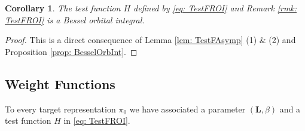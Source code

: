\documentclass[A4]{amsart}
\newtheorem{corollary}  [theorem]{Corollary}
\numberwithin{equation}{section} \everymath{\displaystyle}
\newcommand{\bL}{\mathbf{L}}
\begin{document}
\begin{corollary} \label{cor: TestFROI}
	The test function $H$ defined by \eqref{eq: TestFROI} and Remark \ref{rmk: TestFROI} is a Bessel orbital integral.
\end{corollary}
\begin{proof}
	This is a direct consequence of Lemma \ref{lem: TestFAsymp} (1) \& (2) and Proposition \ref{prop: BesselOrbInt}.
\end{proof}
	

	\subsection{Weight Functions}
	
	To every target representation $\pi_0$ we have associated a parameter $(\bL,\beta)$ and a test function $H$ in \eqref{eq: TestFROI}.
\end{document}
